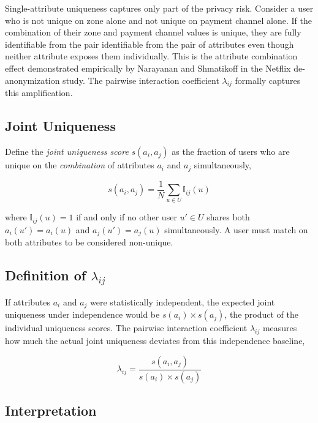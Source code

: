 Single-attribute uniqueness captures only part of the
privacy risk. Consider a user who is not unique on zone
alone and not unique on payment channel alone. If the
combination of their zone and payment channel values is
unique, they are fully identifiable from the pair
identifiable from the pair of attributes even though
neither attribute exposes them individually. This is the
attribute combination effect demonstrated empirically by
Narayanan and Shmatikoff \cite{narayanan2008} in the
Netflix de-anonymization study. The pairwise interaction
coefficient $\lambda_{ij}$ formally captures this
amplification.

\subsection{Joint Uniqueness}

Define the \textit{joint uniqueness score} $s(a_i, a_j)$
as the fraction of users who are unique on the
\textit{combination} of attributes $a_i$ and $a_j$
simultaneously,

\begin{equation}
s(a_i, a_j) = \frac{1}{N}
\sum_{u \in U} \mathbb{I}_{ij}(u)
\label{eq:s_joint}
\end{equation}

where $\mathbb{I}_{ij}(u) = 1$ if and only if no other
user $u' \in U$ shares both $a_i(u') = a_i(u)$ and
$a_j(u') = a_j(u)$ simultaneously. A user must match on
both attributes to be considered non-unique.

\subsection{Definition of $\lambda_{ij}$}

If attributes $a_i$ and $a_j$ were statistically
independent, the expected joint uniqueness under
independence would be $s(a_i) \times s(a_j)$, the
product of the individual uniqueness scores. The pairwise
interaction coefficient $\lambda_{ij}$ measures how much
the actual joint uniqueness deviates from this
independence baseline,

\begin{equation}
\lambda_{ij} = \frac{s(a_i, a_j)}{s(a_i) \times s(a_j)}
\label{eq:lambda}
\end{equation}

\subsection{Interpretation}

